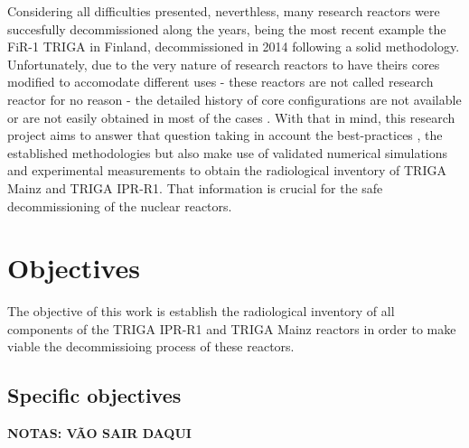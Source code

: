 \documentclass[11pt]{article} %
\begin{document}
Considering all difficulties presented, neverthless, many research reactors were succesfully decommissioned along the years, being the most recent example the FiR-1 TRIGA in Finland, decommissioned in 2014 \cite{Raty_Thesis_2020} following a solid methodology. Unfortunately, due to the very nature of research reactors to have theirs cores modified to accomodate different uses - these reactors are not called research reactor for no reason - the detailed history of core configurations are not available or are not easily obtained in most of the cases \cite[p. xxx]{Clean-up_CEA-e-DEN_2018}. With that in mind, this research project aims to answer that question taking in account the best-practices \cite{AIEA}, the established methodologies \cite{Raty_2024} but also make use of validated numerical simulations and experimental measurements to obtain the radiological inventory of TRIGA Mainz and TRIGA IPR-R1. That information is crucial for the safe decommissioning of the nuclear reactors. %





\section{Objectives}

The objective of this work is establish the radiological inventory of all components of the TRIGA IPR-R1 and TRIGA Mainz reactors in order to make viable the decommissioing process of these reactors. 



\subsection{Specific objectives}

\textbf{NOTAS: VÃO SAIR DAQUI}
\end{document}
